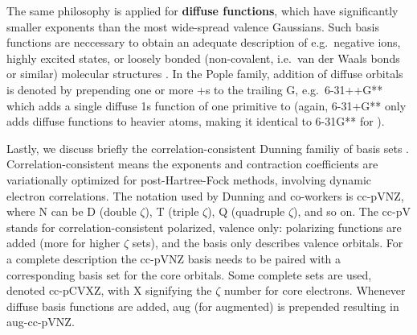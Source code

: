 \documentclass[../../master.tex]{subfiles}
\begin{document}
The same philosophy is applied for {\bf diffuse functions}, which have significantly smaller exponents than the most wide-spread valence Gaussians. Such basis functions are neccessary to obtain an adequate description of e.g.\ negative ions, highly excited states, or loosely bonded (non-covalent, i.e.\ van der Waals bonds or similar) molecular structures \cite{cramer}. In the Pople family, addition of diffuse orbitals is denoted by prepending one or more +s to the trailing G, e.g.\ 6-31++G** which adds a single diffuse 1s function of one primitive to  (again, 6-31+G** only adds diffuse functions to heavier atoms, making it identical to 6-31G** for ).

Lastly, we discuss briefly the correlation-consistent Dunning familiy of basis sets \cite{dunning1989}. Correlation-consistent means the exponents and contraction coefficients are variationally optimized for post-Hartree-Fock methods, involving dynamic electron correlations. The notation used by Dunning and co-workers is cc-pVNZ, where N can be D (double $\zeta$), T (triple $\zeta$), Q (quadruple $\zeta$), and so on. The cc-pV stands for correlation-consistent polarized, valence only: polarizing functions are added (more for higher $\zeta$ sets), and the basis only describes valence orbitals. For a complete description the cc-pVNZ basis needs to be paired with a corresponding basis set for the core orbitals. Some complete sets are used, denoted cc-pCVXZ, with X signifying the $\zeta$ number for core electrons. Whenever diffuse basis functions are added, aug (for augmented) is prepended resulting in aug-cc-pVNZ. 
\end{document}
